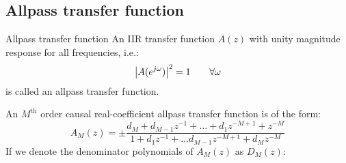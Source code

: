 \documentclass[../../main/main.tex]{subfiles}
\begin{document}
\subsection{Allpass transfer function}
\begin{definition}{Allpass transfer function}{}
    An IIR transfer function \( A(z) \) with unity magnitude response for all frequencies, i.e.:
    \begin{equation}
        \abs{A(e^{j\omega})}^{2}
        =
        1
        \qquad
        \forall \omega
        \label{eq:L17_S44_1}
    \end{equation}
    is called an allpass transfer function.
\end{definition}

An \( M^{\text{th}} \) order causal real-coefficient allpass transfer function is of the form:
\begin{equation}
    A_{M}(z)
    =
    \pm \frac{d_{M} + d_{M-1}z^{-1} + \dots + d_{1}z^{-M+1} + z^{-M}}{1 + d_{1}z^{-1} + \dots d_{M-1}z^{-M+1} + d_{M}z^{-M}}
    \label{eq:L17_S44_2}
\end{equation}
If we denote the denominator polynomials of \( A_{M}(z) \) as \( D_{M}(z) \):

\end{document}
